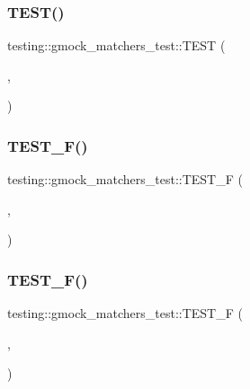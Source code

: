 \subsubsection{\texorpdfstring{T\+E\+S\+T()}{TEST()}\hspace{0.1cm}{\footnotesize\ttfamily [292/292]}}
{\footnotesize\ttfamily testing\+::gmock\+\_\+matchers\+\_\+test\+::\+T\+E\+ST (\begin{DoxyParamCaption}\item[{Unordered\+Pointwise\+Test}]{,  }\item[{Allows\+Monomorphic\+Inner\+Matcher}]{ }\end{DoxyParamCaption})}

\mbox{\label{namespacetesting_1_1gmock__matchers__test_a69257e935b4334c835b3ad26acea9104}} 
\subsubsection{\texorpdfstring{T\+E\+S\+T\+\_\+\+F()}{TEST\_F()}\hspace{0.1cm}{\footnotesize\ttfamily [1/40]}}
{\footnotesize\ttfamily testing\+::gmock\+\_\+matchers\+\_\+test\+::\+T\+E\+S\+T\+\_\+F (\begin{DoxyParamCaption}\item[{\hyperlink{namespacetesting_1_1gmock__matchers__test_a145329e433869625f9f0e98a0cdfd7b4}{Float\+Test}}]{,  }\item[{Float\+Eq\+Approximately\+Matches\+Floats}]{ }\end{DoxyParamCaption})}

\mbox{\label{namespacetesting_1_1gmock__matchers__test_abb691880cd22f6f444c978547b13f792}} 
\subsubsection{\texorpdfstring{T\+E\+S\+T\+\_\+\+F()}{TEST\_F()}\hspace{0.1cm}{\footnotesize\ttfamily [2/40]}}
{\footnotesize\ttfamily testing\+::gmock\+\_\+matchers\+\_\+test\+::\+T\+E\+S\+T\+\_\+F (\begin{DoxyParamCaption}\item[{\hyperlink{namespacetesting_1_1gmock__matchers__test_a145329e433869625f9f0e98a0cdfd7b4}{Float\+Test}}]{,  }\item[{Nan\+Sensitive\+Float\+Eq\+Approximately\+Matches\+Floats}]{ }\end{DoxyParamCaption})}

